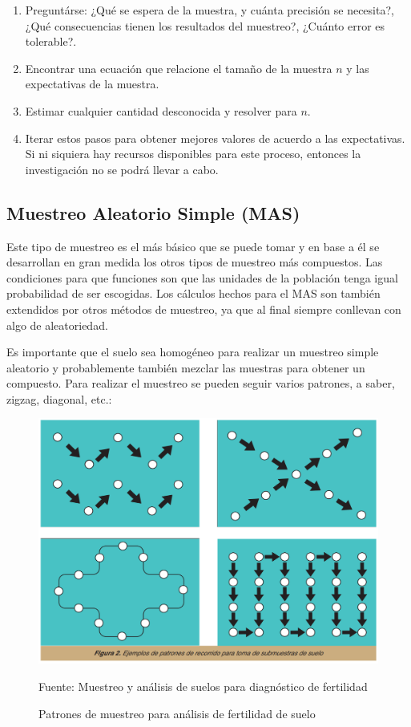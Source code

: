 \documentclass[conference]{IEEEtran}
\begin{document}
\begin{enumerate}
    \item Preguntárse: ¿Qué se espera de la muestra, y cuánta precisión se necesita?, ¿Qué consecuencias tienen los resultados del muestreo?, ¿Cuánto error es tolerable?.
    
    \item Encontrar una ecuación que relacione el tamaño de la muestra $n$ y las expectativas de la muestra.
    
    \item Estimar cualquier cantidad desconocida y resolver para $n$.
    
    \item Iterar estos pasos para obtener mejores valores de acuerdo a las expectativas. Si ni siquiera hay recursos disponibles para este proceso, entonces la investigación no se podrá llevar a cabo.
\end{enumerate}

\subsection{Muestreo Aleatorio Simple (MAS)}

Este tipo de muestreo es el más básico que se puede tomar y en base a él se desarrollan en gran medida los otros tipos de muestreo más compuestos. Las condiciones para que funciones son que las unidades de la población tenga igual probabilidad de ser escogidas. Los cálculos hechos para el MAS son también extendidos por otros métodos de muestreo, ya que al final siempre conllevan con algo de aleatoriedad. 

\bigbreak

Es importante que el suelo sea homogéneo para realizar un muestreo simple aleatorio y probablemente también mezclar las muestras para obtener un compuesto. Para realizar el muestreo se pueden seguir varios patrones, a saber, zigzag, diagonal, etc.:

\begin{figure}[H]
    \centering
    \includegraphics[width=0.3\paperwidth]{ref/sampling-patterns-srs.png}
    \caption{Patrones de muestreo para análisis de fertilidad de suelo} \footnotesize
    Fuente: Muestreo y análisis de suelos para diagnóstico de fertilidad \cite{lassaga-2011}
\end{figure}
\end{document}
